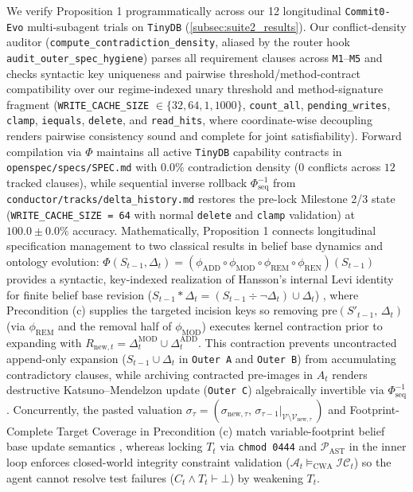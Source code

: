 \documentclass[11pt,a4paper,copyright]{google}
\begin{document}
We verify Proposition 1 programmatically across our 12 longitudinal \texttt{Commit0-Evo} multi-subagent trials on \texttt{TinyDB} (\cref{subsec:suite2_results}). Our conflict-density auditor (\texttt{compute\_\allowbreak contradiction\_\allowbreak density}, aliased by the router hook \texttt{audit\_\allowbreak outer\_\allowbreak spec\_\allowbreak hygiene}) parses all requirement clauses across \texttt{M1}--\texttt{M5} and checks syntactic key uniqueness and pairwise threshold/method-contract compatibility over our regime-indexed unary threshold and method-signature fragment (\texttt{WRITE\_CACHE\_SIZE} $\in \{32, 64, 1, 1000\}$, \texttt{count\_all}, \texttt{pending\_writes}, \texttt{clamp}, \texttt{iequals}, \texttt{delete}, and \texttt{read\_hits}, where coordinate-wise decoupling renders pairwise consistency sound and complete for joint satisfiability). Forward compilation via $\Phi$ maintains all active \texttt{TinyDB} capability contracts in \texttt{openspec/specs/\allowbreak SPEC.md} with $0.0\%$ contradiction density ($0$ conflicts across $12$ tracked clauses), while sequential inverse rollback $\Phi_{\text{seq}}^{-1}$ from \texttt{conductor/tracks/\allowbreak delta\_history.md} restores the pre-lock Milestone 2/3 state (\texttt{WRITE\_CACHE\_SIZE = 64} with normal \texttt{delete} and \texttt{clamp} validation) at $100.0 \pm 0.0\%$ accuracy. Mathematically, Proposition 1 connects longitudinal specification management to two classical results in belief base dynamics and ontology evolution: $\Phi(S_{t-1}, \Delta_t) = (\phi_{\text{ADD}} \circ \phi_{\text{MOD}} \circ \phi_{\text{REM}} \circ \phi_{\text{REN}})(S_{t-1})$ provides a syntactic, key-indexed realization of Hansson's internal Levi identity for finite belief base revision ($S_{t-1} * \Delta_t = (S_{t-1} \div \neg\Delta_t) \cup \Delta_t$) \cite{alchourron1985logic,hansson1994kernel}, where Precondition (c) supplies the targeted incision keys so removing $\text{pre}(S'_{t-1},\, \Delta_t)$ (via $\phi_{\text{REM}}$ and the removal half of $\phi_{\text{MOD}}$) executes kernel contraction prior to expanding with $R_{\text{new},t} = \Delta_t^{\text{MOD}} \cup \Delta_t^{\text{ADD}}$. This contraction prevents uncontracted append-only expansion ($S_{t-1} \cup \Delta_t$ in \texttt{Outer A} and \texttt{Outer B}) from accumulating contradictory clauses, while archiving contracted pre-images in $A_t$ renders destructive Katsuno--Mendelzon update (\texttt{Outer C}) \cite{katsuno1991update} algebraically invertible via $\Phi_{\text{seq}}^{-1}$. Concurrently, the pasted valuation $\sigma_\tau = (\sigma_{\text{new},\tau},\, \sigma_{\tau-1}|_{\mathcal{V} \setminus \mathcal{V}_{\text{new},\tau}}\,)$ and Footprint-Complete Target Coverage in Precondition (c) match variable-footprint belief base update semantics \cite{katsuno1991update,herzig1999update}, whereas locking $T_t$ via \texttt{chmod 0444} and $\mathcal{P}_{\text{AST}}$ in the inner loop enforces closed-world integrity constraint validation ($\mathcal{A}_t \models_{\text{CWA}} \mathcal{IC}_t$) \cite{motik2009bridging} so the agent cannot resolve test failures ($C_t \land T_t \vdash \bot$) by weakening $T_t$.
\end{document}
